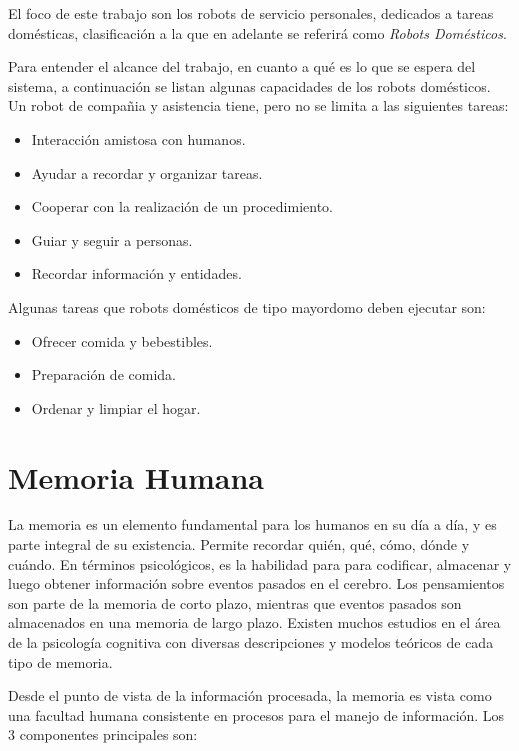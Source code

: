 El foco de este trabajo son los robots de servicio personales, dedicados a tareas dom\'esticas, clasificaci\'on a la que en  adelante se referir\'a como \textit{Robots Dom\'esticos}.

Para entender el alcance del trabajo, en cuanto a qu\'e es lo que se espera del sistema, a continuaci\'on se listan algunas capacidades de los robots dom\'esticos. Un robot de compa\~nia y asistencia tiene, pero no se limita a las siguientes tareas:
\begin{itemize}[topsep=0pt]
\setlength\itemsep{0.2em}
\item Interacci\'on amistosa con humanos.
\item Ayudar a recordar y organizar tareas.
\item Cooperar con la realizaci\'on de un procedimiento.
\item Guiar y seguir a personas.
\item Recordar informaci\'on y entidades.
\end{itemize}
\bigskip

Algunas tareas que robots dom\'esticos de tipo mayordomo deben ejecutar son:
\begin{itemize}[topsep=0pt]
\setlength\itemsep{0.2em}
\item Ofrecer comida y bebestibles.
\item Preparaci\'on de comida.
\item Ordenar y limpiar el hogar.
\end{itemize}
\bigskip


\section{Memoria Humana}

La memoria es un elemento fundamental para los humanos en su d\'ia a d\'ia, y es parte integral de su existencia. Permite recordar qui\'en, qu\'e, c\'omo, d\'onde y cu\'ando. En t\'erminos psicol\'ogicos, es la habilidad para para codificar, almacenar y luego obtener informaci\'on sobre eventos pasados en el cerebro. Los pensamientos son parte de la memoria de corto plazo, mientras que eventos pasados son almacenados en una memoria de largo plazo. Existen muchos estudios en el \'area de la psicolog\'ia cognitiva con diversas descripciones y modelos te\'oricos de cada tipo de memoria\cite{Vijayakumar2014}.

Desde el punto de vista de la informaci\'on procesada, la memoria es vista como una facultad humana consistente en procesos para el manejo de informaci\'on. Los 3 componentes principales son:

